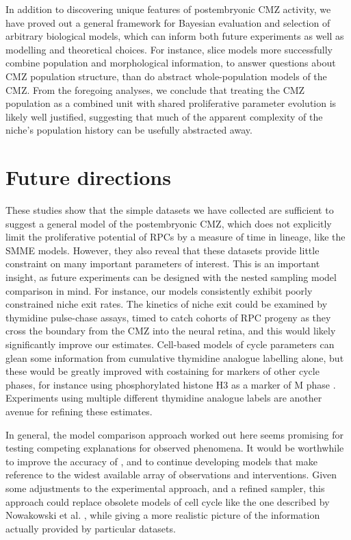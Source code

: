 \documentclass{ut-thesis}
\begin{document}
\begin{NoHyper}
In addition to discovering unique features of postembryonic CMZ activity, we have proved out a general framework for Bayesian evaluation and selection of arbitrary biological models, which can inform both future experiments as well as modelling and theoretical choices. For instance, slice models more successfully combine population and morphological information, to answer questions about CMZ population structure, than do abstract whole-population models of the CMZ. From the foregoing analyses, we conclude that treating the CMZ population as a combined unit with shared proliferative parameter evolution is likely well justified, suggesting that much of the apparent complexity of the niche's population history can be usefully abstracted away.

\section{Future directions}
These studies show that the simple datasets we have collected are sufficient to suggest a general model of the postembryonic CMZ, which does not explicitly limit the proliferative potential of RPCs by a measure of time in lineage, like the SMME models. However, they also reveal that these datasets provide little constraint on many important parameters of interest. This is an important insight, as future experiments can be designed with the nested sampling model comparison in mind. For instance, our models consistently exhibit poorly constrained niche exit rates. The kinetics of niche exit could be examined by thymidine pulse-chase assays, timed to catch cohorts of RPC progeny as they cross the boundary from the CMZ into the neural retina, and this would likely significantly improve our estimates. Cell-based models of cycle parameters can glean some information from cumulative thymidine analogue labelling alone, but these would be greatly improved with costaining for markers of other cycle phases, for instance using phosphorylated histone H3 as a marker of M phase \cite{Ren2018}. Experiments using multiple different thymidine analogue labels \cite{Harris2018} are another avenue for refining these estimates.

In general, the model comparison approach worked out here seems promising for testing competing explanations for observed phenomena. It would be worthwhile to improve the accuracy of \hyperref[chap:GMC]{}, and to continue developing models that make reference to the widest available array of observations and interventions. Given some adjustments to the experimental approach, and a refined sampler, this approach could replace obsolete models of cell cycle like the one described by Nowakowski et al. \cite{Nowakowski1989}, while giving a more realistic picture of the information actually provided by particular datasets.


\end{NoHyper}
\end{document}
